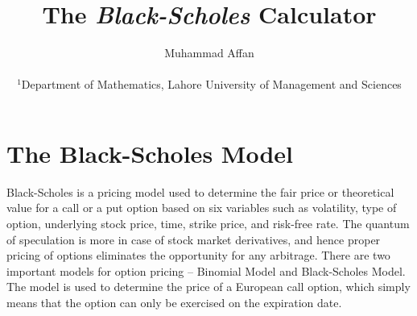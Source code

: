 \documentclass[12pt]{article}
\title{The {\it Black-Scholes\/} Calculator}
\author
{Muhammad Affan\\
	\\
	\normalsize{$^{1}$Department of Mathematics, Lahore University of Management and Sciences}
	\\
}
\date{}
\begin{document}
 
	
	
	\baselineskip24pt
	
	
	\maketitle 
	
	
	

	\newpage	
	\tableofcontents	
	\newpage
		

		

	
	
	
	

	
	
	
	
	\section{The Black-Scholes Model}
	
	Black-Scholes is a pricing model used to determine the fair price or theoretical value for a call or a put option based on six variables such as volatility, type of option, underlying stock price, time, strike price, and risk-free rate. The quantum of speculation is more in case of stock market derivatives, and hence proper pricing of options eliminates the opportunity for any arbitrage. There are two important models for option pricing – Binomial Model and Black-Scholes Model. The model is used to determine the price of a European call option, which simply means that the option can only be exercised on the expiration date.
	
\end{document}
